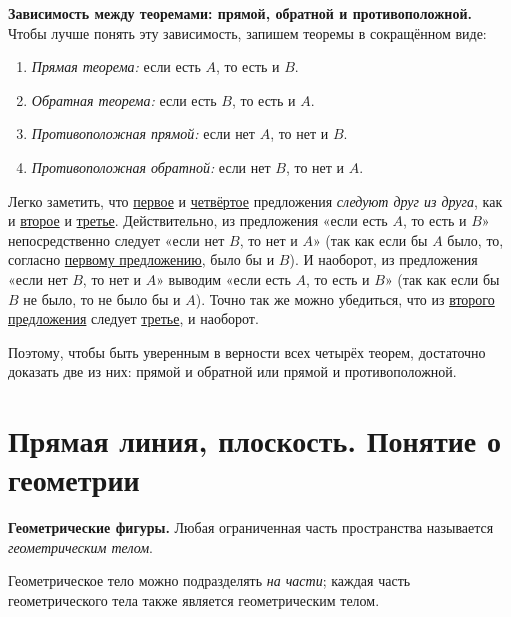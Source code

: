  \textbf{Зависимость между теоремами: прямой, обратной и противоположной.} Чтобы лучше понять эту зависимость, запишем теоремы в сокращённом виде:

\begin{enumerate}[label=\arabic*),ref=\arabic*]
    \item\label{item:direct-theorem} \emph{Прямая теорема:} если есть \(A\), то есть и \(B\).
    \item\label{item:converse-theorem} \emph{Обратная теорема:} если есть \(B\), то есть и \(A\).
    \item\label{item:opposite-direct-theorem} \emph{Противоположная прямой:} если нет \(A\), то нет и \(B\).
    \item\label{item:opposite-converse-theorem} \emph{Противоположная обратной:} если нет \(B\), то нет и \(A\).
\end{enumerate}

Легко заметить, что \hyperref[item:direct-theorem]{первое} и \hyperref[item:opposite-converse-theorem]{четвёртое} предложения \emph{следуют друг из друга}, как и \hyperref[item:converse-theorem]{второе} и \hyperref[item:opposite-direct-theorem]{третье}. Действительно, из предложения «если есть \(A\), то есть и \(B\)» непосредственно следует «если нет \(B\), то нет и \(A\)» (так как если бы \(A\) было, то, согласно \hyperref[item:direct-theorem]{первому предложению}, было бы и \(B\)). И наоборот, из предложения «если нет \(B\), то нет и \(A\)» выводим «если есть \(A\), то есть и \(B\)» (так как если бы \(B\) не было, то не было бы и \(A\)). Точно так же можно убедиться, что из \hyperref[item:converse-theorem]{второго предложения} следует \hyperref[item:opposite-direct-theorem]{третье}, и наоборот.

Поэтому, чтобы быть уверенным в верности всех четырёх теорем, достаточно доказать две из них: прямой и обратной или прямой и противоположной.

\section*{Прямая линия, плоскость. Понятие о геометрии}

 \textbf{Геометрические фигуры.} Любая ограниченная часть пространства называется \emph{геометрическим телом}.

Геометрическое тело можно подразделять \emph{на части}; каждая часть геометрического тела также является геометрическим телом.

